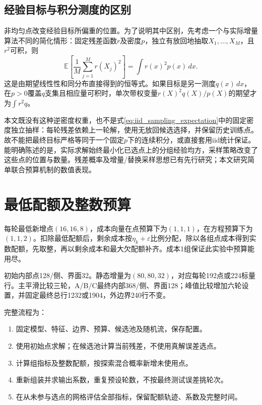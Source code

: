 \subsection{经验目标与积分测度的区别}
非均匀点改变经验目标所偏重的位置。为了说明其中区别，先考虑一个与实际增量算法不同的简化情形：固定残差函数$r$及密度$p$，独立有放回地抽取$X_1,\ldots,X_M$，且$r^2$可积，则
\begin{equation}\label{eq:iid_sampling_expectation}
\mathbb E\left[\frac1M\sum_{j=1}^M r(X_j)^2\right]=\int r(x)^2p(x)\,dx.
\end{equation}
这是由期望线性性和同分布直接得到的恒等式。如果目标是另一测度$q(x)\,dx$，在$p>0$覆盖$q$支集且相应量可积时，单次带权变量$r(X)^2q(X)/p(X)$的期望才为$\int r^2q$。

本文既没有这种逆密度权重，也不是式\eqref{eq:iid_sampling_expectation}中的固定密度独立抽样：每轮残差依赖上一轮解，使用无放回候选选择，并保留历史训练点。故不能把最终目标严格等同于一个固定$p$下的连续积分，或直接套用iid统计保证。能明确陈述的是，实际求解始终最小化已选点上的分组经验均方，采样策略改变了这些点的位置与数量。残差概率及增量/替换采样思想已有先行研究\cite{rar}；本文研究简单联合预算机制的数值表现。

\section{最低配额及整数预算}
每轮最低新增点$(16,16,8)$，成本向量在点预算下为$(1,1,1)$，在方程预算下为$(1,1,2)$。扣除最低配额后，剩余成本按$\eta_k+\varepsilon$比例分配，除以各组点成本得到实数配额，先取整，再以剩余成本和最大欠配额补齐。成本1组保证此实验中预算能用尽。

初始内部点128/侧、界面32。静态增量为$(80,80,32)$，对应每轮192点或224标量行。主平滑比较三轮，A/B/C最终内部368/侧、界面128；峰值比较增加六轮设置，并固定最终总行1232或1904，外边界240行不变。

完整流程为：\begin{enumerate}
\item 固定模型、特征、边界、预算、候选池及随机流，保存配置。
\item 使用初始点求解；在候选池计算当前残差，不使用真解误差选点。
\item 计算组指标及整数配额，按探索混合概率新增未使用点。
\item 重新组装并求输出系数，重复预设轮数，不按最终测试误差挑轮次。
\item 在从未参与选点的网格评估全部指标，保留配额轨迹、系数及完整时间。
\end{enumerate}

